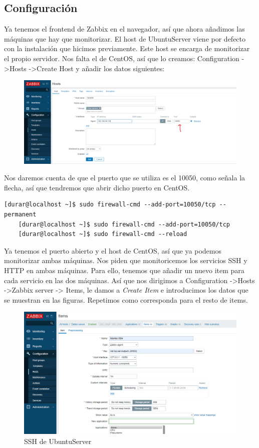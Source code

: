 \documentclass[a4paper]{article}
\begin{document}
\subsection{Configuración}
Ya tenemos el frontend de Zabbix en el navegador, así que ahora añadimos las máquinas que hay que monitorizar.
El host de UbuntuServer viene por defecto con la instalación que hicimos previamente. Este host se encarga 
de monitorizar el propio servidor. Nos falta el de CentOS, así que lo creamos:
Configuration -\textgreater Hosts -\textgreater Create Host y añadir los datos siguientes:
\newpage
\begin{figure}
    \centering
    \includegraphics[width=\textwidth]{creando host centos.png}
\end{figure}
Nos daremos cuenta de que el puerto que se utiliza es el 10050, como señala la flecha, así que tendremos 
que abrir dicho puerto en CentOS.
\begin{lstlisting}[style=bashCentOS]
    [durar@localhost ~]$ sudo firewall-cmd --add-port=10050/tcp --permanent
    [durar@localhost ~]$ sudo firewall-cmd --add-port=10050/tcp
    [durar@localhost ~]$ sudo firewall-cmd --reload
\end{lstlisting}
Ya tenemos el puerto abierto y el host de CentOS, así que ya podemos monitorizar ambas máquinas.
Nos piden que monitoricemos los servicios SSH y HTTP en ambas máquinas. Para ello, tenemos que añadir
un nuevo item para cada servicio en las dos máquinas. 
Así que nos dirigimos a Configuration -\textgreater Hosts -\textgreater Zabbix server -\textgreater
Items, le damos a \textsl{Create Item} e introducimos los datos que se muestran en las figuras. Repetimos como 
corresponda para el resto de items.
\newline
\begin{figure}[hbt!]
    \caption{SSH de UbuntuServer}
    \includegraphics[width=\textwidth]{creando item ssh.png}
\end{figure} 
\end{document}
